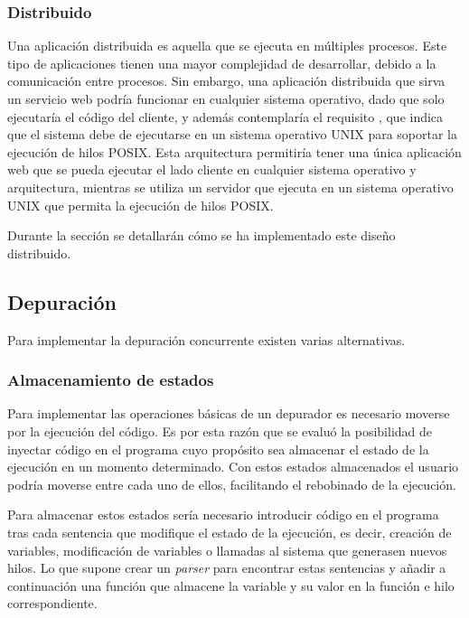 \subsubsection{Distribuido} \label{sec:distribuido}

Una aplicación distribuida es aquella que se ejecuta en múltiples procesos. Este tipo de aplicaciones tienen una mayor complejidad de desarrollar, debido a la comunicación entre procesos. Sin embargo, una aplicación distribuida que sirva un servicio web podría funcionar en cualquier sistema operativo, dado que solo ejecutaría el código del cliente, y además contemplaría el requisito , que indica que el sistema debe de ejecutarse en un sistema operativo UNIX para soportar la ejecución de hilos POSIX. Esta arquitectura permitiría tener una única aplicación web que se pueda ejecutar el lado cliente en cualquier sistema operativo y arquitectura, mientras se utiliza un servidor que ejecuta en un sistema operativo UNIX que permita la ejecución de hilos POSIX.

Durante la sección  se detallarán cómo se ha implementado este diseño distribuido. 

\subsection{Depuración} \label{sec:depuracion}

Para implementar la depuración concurrente existen varias alternativas. 

\subsubsection{Almacenamiento de estados} \label{sec:almacenamiento-estados}

Para implementar las operaciones básicas de un depurador es necesario moverse por la ejecución del código. Es por esta razón que se evaluó la posibilidad de inyectar código en el programa cuyo propósito sea almacenar el estado de la ejecución en un momento determinado. Con estos estados almacenados el usuario podría moverse entre cada uno de ellos, facilitando el rebobinado de la ejecución.

Para almacenar estos estados sería necesario introducir código en el programa tras cada sentencia que modifique el estado de la ejecución, es decir, creación de variables, modificación de variables o llamadas al sistema que generasen nuevos hilos. Lo que supone crear un \textit{\gls{parser}} para encontrar estas sentencias y añadir a continuación una función que almacene la variable y su valor en la función e hilo correspondiente. 

